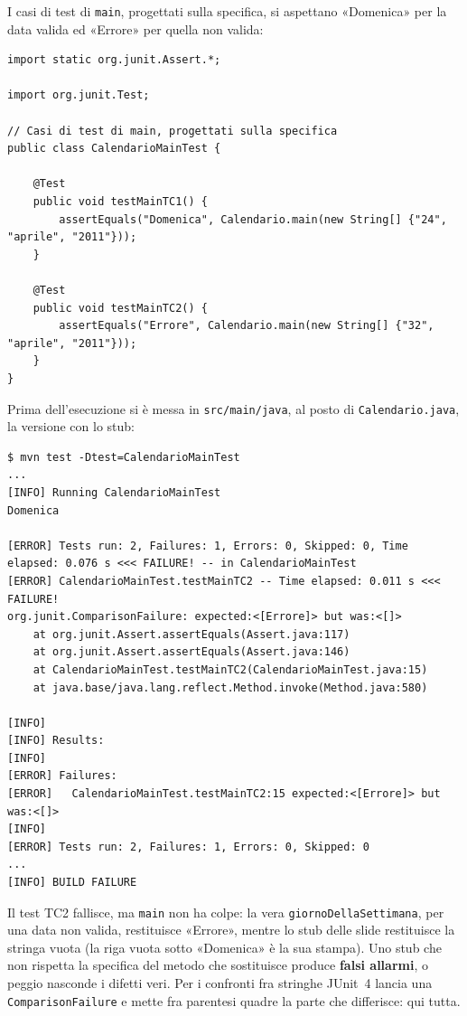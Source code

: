 I casi di test di \texttt{main}, progettati sulla specifica, si aspettano «Domenica» per la data valida ed «Errore» per
quella non valida:

\begin{lstlisting}[style=java, name=CalendarioMainTest.java]
import static org.junit.Assert.*;

import org.junit.Test;

// Casi di test di main, progettati sulla specifica
public class CalendarioMainTest {

    @Test
    public void testMainTC1() {
        assertEquals("Domenica", Calendario.main(new String[] {"24", "aprile", "2011"}));
    }

    @Test
    public void testMainTC2() {
        assertEquals("Errore", Calendario.main(new String[] {"32", "aprile", "2011"}));
    }
}
\end{lstlisting}

Prima dell'esecuzione si è messa in \texttt{src/main/java}, al posto di \texttt{Calendario.java}, la versione con lo
stub:

\begin{lstlisting}[style=shell, name=Terminale, deletekeywords={java}]
$ mvn test -Dtest=CalendarioMainTest
...
[INFO] Running CalendarioMainTest
Domenica

[ERROR] Tests run: 2, Failures: 1, Errors: 0, Skipped: 0, Time elapsed: 0.076 s <<< FAILURE! -- in CalendarioMainTest
[ERROR] CalendarioMainTest.testMainTC2 -- Time elapsed: 0.011 s <<< FAILURE!
org.junit.ComparisonFailure: expected:<[Errore]> but was:<[]>
    at org.junit.Assert.assertEquals(Assert.java:117)
    at org.junit.Assert.assertEquals(Assert.java:146)
    at CalendarioMainTest.testMainTC2(CalendarioMainTest.java:15)
    at java.base/java.lang.reflect.Method.invoke(Method.java:580)

[INFO]
[INFO] Results:
[INFO]
[ERROR] Failures:
[ERROR]   CalendarioMainTest.testMainTC2:15 expected:<[Errore]> but was:<[]>
[INFO]
[ERROR] Tests run: 2, Failures: 1, Errors: 0, Skipped: 0
...
[INFO] BUILD FAILURE
\end{lstlisting}

Il test TC2 fallisce, ma \texttt{main} non ha colpe: la vera \texttt{giornoDellaSettimana}, per una data non valida,
restituisce «Errore», mentre lo stub delle slide restituisce la stringa vuota (la riga vuota sotto «Domenica» è la sua
stampa). Uno stub che non rispetta la specifica del metodo che sostituisce produce \textbf{falsi allarmi}, o peggio
nasconde i difetti veri. Per i confronti fra stringhe JUnit~4 lancia una \texttt{ComparisonFailure} e mette fra
parentesi quadre la parte che differisce: qui tutta.


